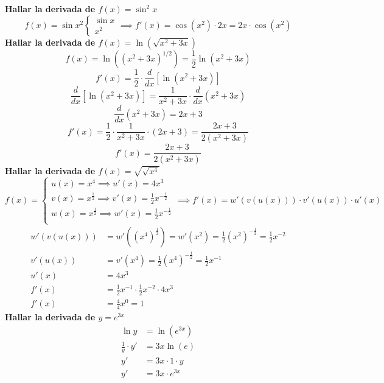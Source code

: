 \documentclass[12pt,a4paper,fleqn]{article}
\begin{document}
\vspace{1em}
\noindent\textbf{Hallar la derivada de $f(x)=\sin^2 x$}
\[
	f(x) = \sin x^2
	\begin{cases}
		\sin x \\
		x^2
	\end{cases}
	\implies f'(x)=\cos(x^2)\cdot2x=2x\cdot \cos(x^2)
\]
\noindent\textbf{Hallar la derivada de \( f(x) = \ln (\sqrt{x^2 + 3x}) \)}
\[
	f(x) = \ln ((x^2 + 3x)^{1/2}) = \frac{1}{2} \ln (x^2 + 3x)
\]
\[
	f'(x) = \frac{1}{2} \cdot \frac{d}{dx} [\ln (x^2 + 3x)]
\]
\[
	\frac{d}{dx} [\ln (x^2 + 3x)] = \frac{1}{x^2 + 3x} \cdot \frac{d}{dx} (x^2 + 3x)
\]
\[
	\frac{d}{dx} (x^2 + 3x) = 2x + 3
\]
\[
	f'(x) = \frac{1}{2} \cdot \frac{1}{x^2 + 3x} \cdot (2x + 3) = \frac{2x + 3}{2(x^2 + 3x)}
\]
\[
	f'(x) = \frac{2x + 3}{2(x^2 + 3x)}
\]
\textbf{Hallar la derivada de $f(x)=\sqrt{\sqrt{x^4}}$}
\[
	f(x) =
	\begin{cases}
		u(x)=x^4 \implies u'(x) = 4x^3                                    \\
		v(x)=x^{\frac{1}{2}} \implies v'(x) = \frac{1}{2}x^{-\frac{1}{2}} \\
		w(x)=x^{\frac{1}{2}} \implies w'(x) = \frac{1}{2}x^{-\frac{1}{2}} \\
	\end{cases}
	\implies f'(x)=w'(v(u(x)))\cdot v'(u(x))\cdot u'(x)
\]
\begin{align*}
	w'(v(u(x))) & = w'((x^4)^\frac{1}{2}) =w'(x^2) = \frac{1}{2}(x^2)^{-\frac{1}{2}} =\frac{1}{2}x^{-2} \\
	v'(u(x))    & = v'(x^4) = \frac{1}{2}(x^4)^{-\frac{1}{2}}=\frac{1}{2}x^{-1}                         \\
	u'(x)       & = 4x^3                                                                                \\
	f'(x)       & =\frac{1}{2}x^{-1}\cdot \frac{1}{2}x^{-2}\cdot 4x^3                                   \\
	f'(x)       & =\frac{4}{4}x^{0} = 1
\end{align*}
\textbf{Hallar la derivada de $y=e^{3x}$}
\begin{align*}
	\ln y               & = \ln(e^{3x})      \\
	\frac{1}{y}\cdot y' & = 3x\ln(e)         \\
	y'                  & = 3x\cdot 1\cdot y \\
	y'                  & = 3x\cdot e^{3x}   \\
\end{align*}
\end{document}
